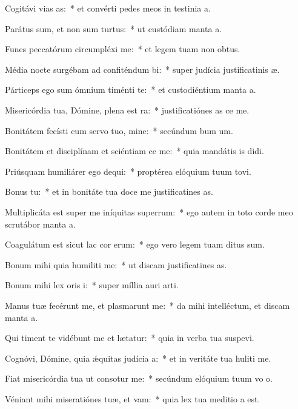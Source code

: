 \item Cogitávi vias as:~* et convérti pedes meos in testinia a.
\item Parátus sum, et non sum turtus:~* ut custódiam manta a.
\item Funes peccatórum circumpléxi  me:~* et legem tuam non  obtus.
\item Média nocte surgébam ad confiténdum bi:~* super judícia justificatinis æ.
\item Párticeps ego sum ómnium timénti te:~* et custodiéntium manta a.
\item Misericórdia tua, Dómine, plena est ra:~* justificatiónes as ce me.
\item Bonitátem fecísti cum servo tuo, mine:~* secúndum bum um.
\item Bonitátem et disciplínam et sciéntiam ce me:~* quia mandátis is didi.
\item Priúsquam humiliárer ego dequi:~* proptérea elóquium tuum tovi.
\item Bonus  tu:~* et in bonitáte tua doce me justificatines as.
\item Multiplicáta est super me iníquitas superrum:~* ego autem in toto corde meo scrutábor manta a.
\item Coagulátum est sicut lac cor erum:~* ego vero legem tuam ditus sum.
\item Bonum mihi quia humiliti me:~* ut discam justificatines as.
\item Bonum mihi lex oris i:~* super míllia auri  arti.
\item Manus tuæ fecérunt me, et plasmarunt me:~* da mihi intelléctum, et discam manta a.
\item Qui timent te vidébunt me et lætatur:~* quia in verba tua suspevi.
\item Cognóvi, Dómine, quia ǽquitas judícia a:~* et in veritáte tua huliti me.
\item Fiat misericórdia tua ut consotur me:~* secúndum elóquium tuum vo o.
\item Véniant mihi miseratiónes tuæ, et vam:~* quia lex tua meditio a est.
